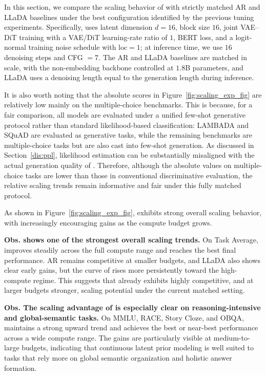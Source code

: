 In this section, we compare the scaling behavior of \method with strictly matched AR and LLaDA baselines under the best configuration identified by the previous tuning experiments. Specifically, \method uses latent dimension $d=16$, block size $16$, joint VAE--DiT training with a VAE/DiT learning-rate ratio of $1$, BERT loss, and a logit-normal training noise schedule with $\mathrm{loc}=1$; at inference time, we use $16$ denoising steps and CFG $=7$. The AR and LLaDA baselines are matched in scale, with the non-embedding backbone controlled at $1.8$B parameters, and LLaDA uses a denoising length equal to the generation length during inference.

It is also worth noting that the absolute scores in Figure~\ref{fig:scaling_exp_fig} are relatively low mainly on the multiple-choice benchmarks. This is because, for a fair comparison, all models are evaluated under a unified few-shot generative protocol rather than standard likelihood-based classification: LAMBADA and SQuAD are evaluated as generative tasks, while the remaining benchmarks are multiple-choice tasks but are also cast into few-shot generation. As discussed in Section~\ref{dis:ppl}, likelihood estimation can be substantially misaligned with the actual generation quality of \method. Therefore, although the absolute values on multiple-choice tasks are lower than those in conventional discriminative evaluation, the relative scaling trends remain informative and fair under this fully matched protocol.

As shown in Figure~\ref{fig:scaling_exp_fig}, \method exhibits strong overall scaling behavior, with increasingly encouraging gains as the compute budget grows.

\textbf{Obs.  \method shows one of the strongest overall scaling trends.}
On Task Average, \method improves steadily across the full compute range and reaches the best final performance. AR remains competitive at smaller budgets, and LLaDA also shows clear early gains, but the curve of \method rises more persistently toward the high-compute regime. This suggests that \method already exhibits highly competitive, and at larger budgets stronger, scaling potential under the current matched setting.

\textbf{Obs.  The scaling advantage of \method is especially clear on reasoning-intensive and global-semantic tasks.}
On MMLU, RACE, Story Cloze, and OBQA, \method maintains a strong upward trend and achieves the best or near-best performance across a wide compute range. The gains are particularly visible at medium-to-large budgets, indicating that continuous latent prior modeling is well suited to tasks that rely more on global semantic organization and holistic answer formation.

